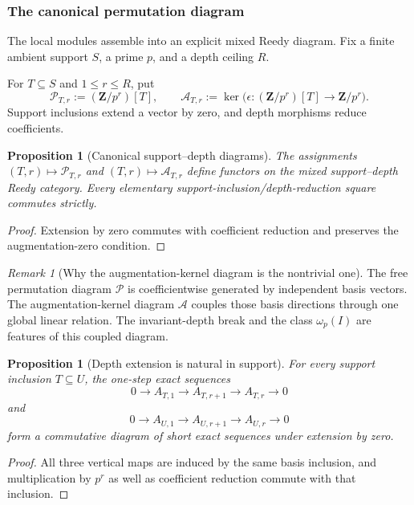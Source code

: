 \documentclass[11pt]{article}
\newtheorem{proposition}[theorem]{Proposition}
\theoremstyle{remark}
\newtheorem{remark}[theorem]{Remark}
\newcommand{\Z}{\mathbf Z}
\begin{document}
\subsubsection{The canonical permutation diagram}

The local modules assemble into an explicit mixed Reedy diagram.  Fix a finite ambient support \(S\), a prime \(p\), and a depth ceiling \(R\).

For \(T\subseteq S\) and \(1\le r\le R\), put
\[
 \mathcal P_{T,r}:=(\Z/p^r)[T],
 \qquad
 \mathcal A_{T,r}:=\ker\bigl(\epsilon:(\Z/p^r)[T]\to\Z/p^r\bigr).
\]
Support inclusions extend a vector by zero, and depth morphisms reduce coefficients.

\begin{proposition}[Canonical support--depth diagrams]\label{P1C-prop:canonical-diagrams}
The assignments \((T,r)\mapsto\mathcal P_{T,r}\) and \((T,r)\mapsto\mathcal A_{T,r}\) define functors on the mixed support--depth Reedy category.  Every elementary support-inclusion/depth-reduction square commutes strictly.
\end{proposition}

\begin{proof}
Extension by zero commutes with coefficient reduction and preserves the augmentation-zero condition.
\end{proof}

\begin{remark}[Why the augmentation-kernel diagram is the nontrivial one]
The free permutation diagram \(\mathcal P\) is coefficientwise generated by independent basis vectors.  The augmentation-kernel diagram \(\mathcal A\) couples those basis directions through one global linear relation.  The invariant-depth break and the class \(\omega_p(I)\) are features of this coupled diagram.
\end{remark}

\begin{proposition}[Depth extension is natural in support]\label{P1C-prop:extension-natural-support}
For every support inclusion \(T\subseteq U\), the one-step exact sequences
\[
 0\to A_{T,1}\to A_{T,r+1}\to A_{T,r}\to0
\]
and
\[
 0\to A_{U,1}\to A_{U,r+1}\to A_{U,r}\to0
\]
form a commutative diagram of short exact sequences under extension by zero.
\end{proposition}

\begin{proof}
All three vertical maps are induced by the same basis inclusion, and multiplication by \(p^r\) as well as coefficient reduction commute with that inclusion.
\end{proof}
\end{document}
